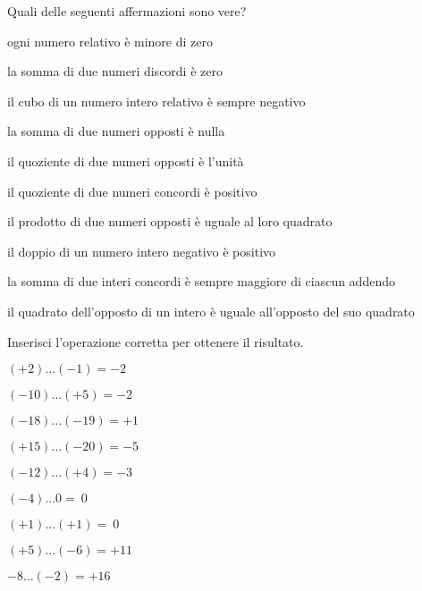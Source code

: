 \begin{esercizio}
Quali delle seguenti affermazioni sono vere?
\TabPositions{12cm}
\begin{enumeratea}
 \item ogni numero relativo è minore di zero \tab\boxV\quad\boxF
 \item la somma di due numeri discordi è zero \tab\boxV\quad\boxF
 \item il cubo di un numero intero relativo è sempre negativo 
\tab\boxV\quad\boxF
 \item la somma di due numeri opposti è nulla \tab\boxV\quad\boxF
 \item il quoziente di due numeri opposti è l'unità \tab\boxV\quad\boxF
 \item il quoziente di due numeri concordi è positivo \tab\boxV\quad\boxF
 \item il prodotto di due numeri opposti è uguale al loro quadrato 
\tab\boxV\quad\boxF
 \item il doppio di un numero intero negativo è positivo \tab\boxV\quad\boxF
 \item la somma di due interi concordi è sempre maggiore di ciascun addendo 
\tab\boxV\quad\boxF
 \item il quadrato dell'opposto di un intero è uguale all'opposto del suo 
quadrato \tab\boxV\quad\boxF
\end{enumeratea}
\end{esercizio}

\begin{esercizio}
Inserisci l'operazione corretta per ottenere il risultato.
 \begin{multicols}{3}
 \begin{enumeratea}
 \item \((+2)\ldots(-1) = -2\)
 \item \((-10)\ldots(+5) = -2\)
 \item \((-18)\ldots(-19) = +1\)
 \item \((+15)\ldots(-20) = -5\)
 \item \((-12)\ldots(+4) = -3\)
 \item \((-4)\ldots0 =~0\)
 \item \((+1)\ldots(+1) =~0\)
 \item \((+5)\ldots(-6) = +11\)
 \item \(-8\ldots(-2) = +16\)
 \end{enumeratea}
 \end{multicols}
\end{esercizio}


